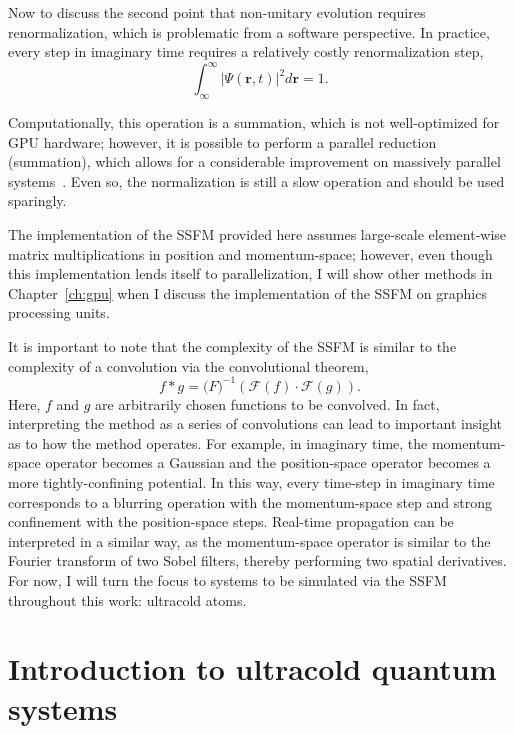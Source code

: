 Now to discuss the second point that non-unitary evolution requires renormalization, which is problematic from a software perspective.
In practice, every step in imaginary time requires a relatively costly renormalization step,
\begin{equation}
    \label{eqn:norm}
    \int_\infty^\infty |\Psi(\mathbf{r},t)|^2 d\mathbf{r} = 1.
\end{equation}

\noindent Computationally, this operation is a summation, which is not well-optimized for GPU hardware; however, it is possible to perform a parallel reduction (summation), which allows for a considerable improvement on massively parallel systems~\cite{harris2007}.
Even so, the normalization is still a slow operation and should be used sparingly.

The implementation of the SSFM provided here assumes large-scale element-wise matrix multiplications in position and momentum-space; however, even though this implementation lends itself to parallelization, I will show other methods in Chapter~\ref{ch:gpu} when I discuss the implementation of the SSFM on graphics processing units.

It is important to note that the complexity of the SSFM is similar to the complexity of a convolution via the convolutional theorem,
\begin{equation}
f * g = \mathcal(F)^{-1}\left(\mathcal{F}(f)\cdot\mathcal{F}(g)\right).
\end{equation}
Here, $f$ and $g$ are arbitrarily chosen functions to be convolved.
In fact, interpreting the method as a series of convolutions can lead to important insight as to how the method operates.
For example, in imaginary time, the momentum-space operator becomes a Gaussian and the position-space operator becomes a more tightly-confining potential.
In this way, every time-step in imaginary time corresponds to a blurring operation with the momentum-space step and strong confinement with the position-space steps.
Real-time propagation can be interpreted in a similar way, as the momentum-space operator is similar to the Fourier transform of two Sobel filters, thereby performing two spatial derivatives.
For now, I will turn the focus to systems to be simulated via the SSFM throughout this work: ultracold atoms.

\section{Introduction to ultracold quantum systems}
\label{sec:intro}

